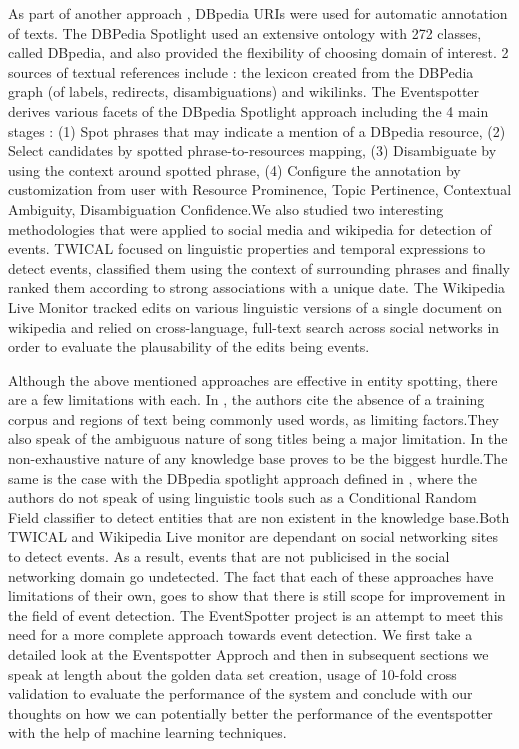 \documentclass[a4paper,11pt]{report}
\begin{document}
As part of another approach , DBpedia URIs were used for automatic annotation of texts. The DBPedia Spotlight \cite{Mendes11dbpediaspotlight:} used an extensive ontology with 272 classes, called DBpedia, and also provided the flexibility of choosing domain of interest. 2 sources of textual references include : the lexicon created from the DBPedia graph (of labels, redirects, disambiguations) and wikilinks. The Eventspotter derives various facets of the DBpedia Spotlight approach including the 4 main stages : (1) Spot phrases that may indicate a mention of a DBpedia  resource, (2) Select candidates by spotted phrase-to-resources mapping, (3) Disambiguate by using the context around spotted phrase, (4) Configure the annotation by customization from user with  Resource Prominence, Topic Pertinence, Contextual Ambiguity, Disambiguation Confidence.We also studied two interesting methodologies that were applied to social media and wikipedia for detection of events. TWICAL \cite{Ritter_opendomain} focused on linguistic properties and temporal expressions to detect events, classified them using the context of surrounding phrases and finally ranked them according to strong associations with a unique date. The Wikipedia Live Monitor\cite{DBLP:journals/corr/abs-1303-4702} tracked edits on various linguistic versions of a single document on wikipedia and relied on cross-language, full-text search across social networks in order to evaluate the plausability of the edits being events. \newline

Although the above mentioned approaches are effective in entity spotting, there are a few limitations with each. In \cite{Gruhl_contextand}, the authors cite the absence of a training corpus and regions of text being commonly used words, as limiting factors.They  also speak of the ambiguous nature of song titles being a major limitation. In  \cite{Hassell06ontology-drivenautomatic} the non-exhaustive nature of any knowledge base proves to be the biggest hurdle.The same is the case with the DBpedia spotlight approach defined in \cite{Mendes11dbpediaspotlight:}, where the authors do not speak of using linguistic tools such as a Conditional Random Field classifier to detect entities that are non existent in the knowledge base.Both TWICAL \cite{Ritter_opendomain} and Wikipedia Live monitor \cite{DBLP:journals/corr/abs-1303-4702} are dependant on social networking sites to detect events. As a result, events that are not publicised in the social networking domain go undetected. The fact that each of these approaches have limitations of their own, goes to show that there is still scope for improvement in the field of event detection. The EventSpotter project is an attempt to meet this need for a more complete approach towards event detection. We first take a detailed look at the Eventspotter Approch and then in subsequent sections we speak at length about the golden data set creation, usage of 10-fold cross validation to evaluate the performance of the system and conclude with our thoughts on how we can potentially better the performance of the eventspotter with the help of machine learning techniques. 
\end{document}
